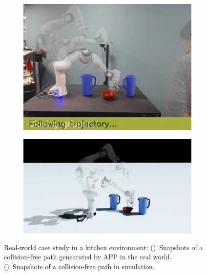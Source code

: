\documentclass[a4paper]{report}
\begin{document}
\begin{figure}[t]
    \centering
    \begin{subfigure}{0.48\textwidth}
         \includegraphics[trim={0.5cm 1.5cm 3cm 0},clip, width=\textwidth]{path_real.png}
        \caption{}
        \label{fig:real}
    \end{subfigure} 
    \begin{subfigure}{0.48\textwidth}
         \includegraphics[trim={8cm 0.55cm 8cm 0.55cm},clip, width=\textwidth]{path_sim.png}
        \caption{}
        \label{fig:sim}
    \end{subfigure}
    \caption{
    Real-world case study in a kitchen environment: 
     ()~Snapshots of a collision-free path genearated by APP in the real world.
    ()~Snapshots of a collision-free path in simulation.
    }
\label{fig:real-world}
\end{figure}
\end{document}
